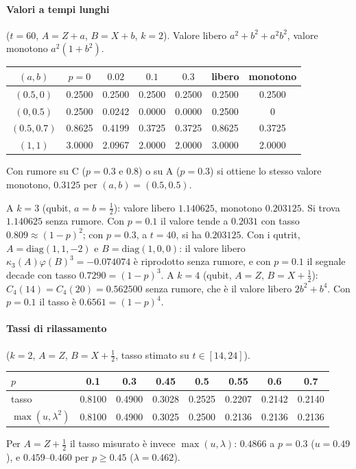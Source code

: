 \paragraph{Valori a tempi lunghi} ($t=60$, $A=Z+a$, $B=X+b$, $k=2$). Valore libero $a^2+b^2+a^2b^2$, valore monotono $a^2(1+b^2)$.
\begin{center}\small
\begin{tabular}{@{}ccccccc@{}}
\toprule
$(a,b)$ & $p=0$ & $0.02$ & $0.1$ & $0.3$ & libero & monotono\\
\midrule
$(0.5,0)$ & 0.2500 & 0.2500 & 0.2500 & 0.2500 & 0.2500 & 0.2500\\
$(0,0.5)$ & 0.2500 & 0.0242 & 0.0000 & 0.0000 & 0.2500 & 0\\
$(0.5,0.7)$ & 0.8625 & 0.4199 & 0.3725 & 0.3725 & 0.8625 & 0.3725\\
$(1,1)$ & 3.0000 & 2.0967 & 2.0000 & 2.0000 & 3.0000 & 2.0000\\
\bottomrule
\end{tabular}
\end{center}
Con rumore su C ($p=0.3$ e $0.8$) o su A ($p=0.3$) si ottiene lo stesso valore monotono, $0.3125$ per $(a,b)=(0.5,0.5)$.

A $k=3$ (qubit, $a=b=\tfrac12$): valore libero $1.140625$, monotono $0.203125$. Si trova $1.140625$ senza rumore. Con $p=0.1$ il valore tende a $0.2031$ con tasso $0.809\approx(1-p)^2$; con $p=0.3$, a $t=40$, si ha $0.203125$. Con i qutrit, $A=\mathrm{diag}(1,1,-2)$ e $B=\mathrm{diag}(1,0,0)$: il valore libero $\kappa_3(A)\varphi(B)^3=-0.074074$ è riprodotto senza rumore, e con $p=0.1$ il segnale decade con tasso $0.7290=(1-p)^3$. A $k=4$ (qubit, $A=Z$, $B=X+\tfrac12$): $C_4(14)=C_4(20)=0.562500$ senza rumore, che è il valore libero $2b^2+b^4$. Con $p=0.1$ il tasso è $0.6561=(1-p)^4$.

\paragraph{Tassi di rilassamento} ($k=2$, $A=Z$, $B=X+\tfrac12$, tasso stimato su $t\in[14,24]$).
\begin{center}\small
\begin{tabular}{@{}lccccccc@{}}
\toprule
$p$ & 0.1 & 0.3 & 0.45 & 0.5 & 0.55 & 0.6 & 0.7\\
\midrule
tasso & 0.8100 & 0.4900 & 0.3028 & 0.2525 & 0.2207 & 0.2142 & 0.2140\\
$\max(u,\lambda^2)$ & 0.8100 & 0.4900 & 0.3025 & 0.2500 & 0.2136 & 0.2136 & 0.2136\\
\bottomrule
\end{tabular}
\end{center}
Per $A=Z+\tfrac12$ il tasso misurato è invece $\max(u,\lambda)$: $0.4866$ a $p=0.3$ ($u=0.49$), e $0.459$--$0.460$ per $p\ge0.45$ ($\lambda=0.462$).
